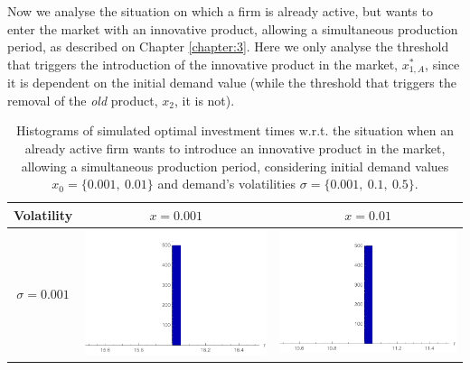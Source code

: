 \vspace{3mm}
Now we analyse the situation on which a firm is already active, but wants to enter the market with an innovative product, allowing a simultaneous production period, as described on Chapter \ref{chapter:3}. Here we only analyse the threshold that triggers the introduction of the innovative product in the market, $x^*_{1,A}$, since it is dependent on the initial demand value (while the threshold that triggers the removal of the \textit{old} product, $x_2$, it is not).


\begin{table}[!htb]
	\caption{Histograms of simulated optimal investment times w.r.t. the situation when an already active firm wants to introduce an innovative product in the market, allowing a simultaneous production period, considering initial demand values $x_0=\{0.001,\ 0.01\}$ and demand's volatilities $\sigma=\{0.001, \ 0.1, \ 0.5 \}$.}
	\begin{tabular}{c|c|c}
		\hline
		Volatility & $x=0.001$ & $x=0.01$ \\ \hline
		$\sigma=0.001$ & \begin{minipage}{.45\textwidth}
			\includegraphics[width=\linewidth]{StopTime/3x001o001.pdf}
		\end{minipage}
		& \begin{minipage}{.45\textwidth}
			\includegraphics[width=\linewidth]{StopTime/3x01o001.pdf}

\end{minipage}
\end{tabular}
\end{table}
